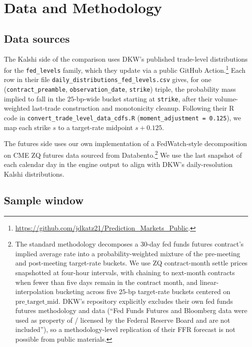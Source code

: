\documentclass[11pt]{article}
\begin{document}
\section{Data and Methodology}

\subsection{Data sources}

The Kalshi side of the comparison uses DKW's published trade-level
distributions for the \texttt{fed\_levels} family, which they update
via a public GitHub Action.\footnote{\url{https://github.com/jdkatz21/Prediction_Markets_Public}.}
Each row in their file
\texttt{daily\_distributions\_fed\_levels.csv} gives, for one
(\texttt{contract\_preamble}, \texttt{observation\_date},
\texttt{strike}) triple, the probability mass implied to fall in the
$25$-bp-wide bucket starting at \texttt{strike}, after their
volume-weighted last-trade construction and monotonicity cleanup.
Following their R code in
\texttt{convert\_trade\_level\_data\_cdfs.R}
(\texttt{moment\_adjustment = 0.125}), we map each strike $s$ to a
target-rate midpoint $s + 0.125$.

The futures side uses our own implementation of a FedWatch-style
decomposition on CME ZQ futures data sourced from
Databento.\footnote{The standard methodology decomposes a 30-day
fed funds futures contract's implied average rate into a
probability-weighted mixture of the pre-meeting and post-meeting
target-rate buckets. We use ZQ contract-month settle prices
snapshotted at four-hour intervals, with chaining to next-month
contracts when fewer than five days remain in the contract month, and
linear-interpolation bucketing across five $25$-bp target-rate
buckets centered on $\mathrm{pre\_target\_mid}$. DKW's repository
explicitly excludes their own fed funds futures methodology and data
(``Fed Funds Futures and Bloomberg data were used as property of /
licensed by the Federal Reserve Board and are not included''), so a
methodology-level replication of their FFR forecast is not possible
from public materials.} We use the last snapshot of each calendar
day in the engine output to align with DKW's daily-resolution Kalshi
distributions.

\subsection{Sample window}
\end{document}
